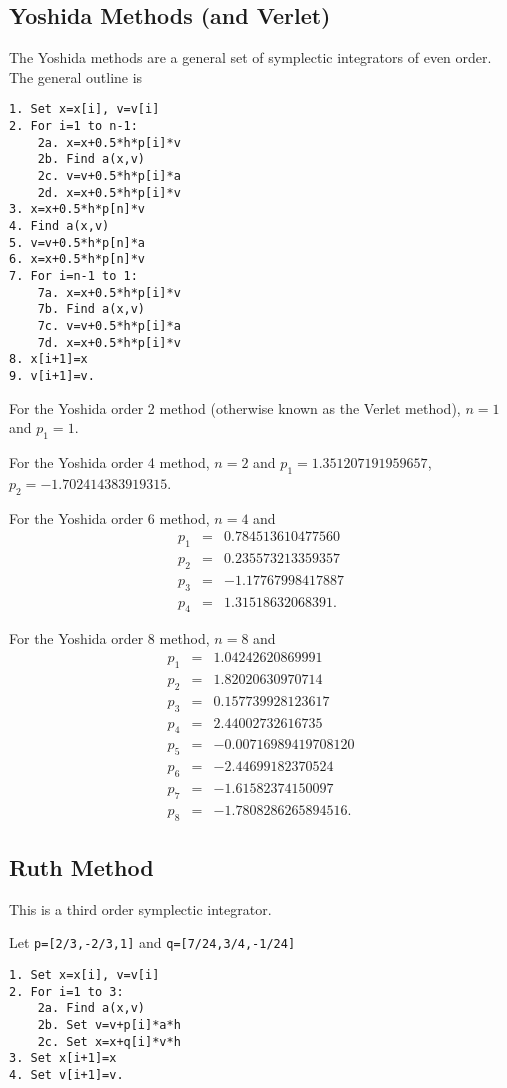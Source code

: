 \documentclass[11pt]{article}
\begin{document}
\subsection{Yoshida Methods (and Verlet)}
The Yoshida methods are a general set of symplectic integrators of even order.
The general outline is
\begin{verbatim}
1. Set x=x[i], v=v[i]
2. For i=1 to n-1:
    2a. x=x+0.5*h*p[i]*v
    2b. Find a(x,v)
    2c. v=v+0.5*h*p[i]*a
    2d. x=x+0.5*h*p[i]*v
3. x=x+0.5*h*p[n]*v
4. Find a(x,v)
5. v=v+0.5*h*p[n]*a
6. x=x+0.5*h*p[n]*v
7. For i=n-1 to 1:
    7a. x=x+0.5*h*p[i]*v
    7b. Find a(x,v)
    7c. v=v+0.5*h*p[i]*a
    7d. x=x+0.5*h*p[i]*v
8. x[i+1]=x
9. v[i+1]=v.
\end{verbatim}
For the Yoshida order 2 method 
(otherwise known as the Verlet method), $n=1$ and
$p_1=1$.

For the Yoshida order 4 method, $n=2$ and
$p_1=1.351207191959657$, $p_2=-1.702414383919315$.

For the Yoshida order 6 method, $n=4$ and\\
\begin{eqnarray*}
p_1&=&0.784513610477560\\
p_2&=&0.235573213359357\\
p_3&=&-1.17767998417887\\
p_4&=&1.31518632068391.
\end{eqnarray*}

For the Yoshida order 8 method, $n=8$ and\\
\begin{eqnarray*}
p_1&=&1.04242620869991\\
p_2&=&1.82020630970714\\
p_3&=&0.157739928123617\\
p_4&=&2.44002732616735\\
p_5&=&-0.00716989419708120\\
p_6&=&-2.44699182370524\\
p_7&=&-1.61582374150097\\
p_8&=& -1.7808286265894516.
\end{eqnarray*}

\subsection{Ruth Method}
This is a third order symplectic integrator.


Let \verb|p=[2/3,-2/3,1]| and \verb|q=[7/24,3/4,-1/24]|
\begin{verbatim}
1. Set x=x[i], v=v[i]
2. For i=1 to 3:
    2a. Find a(x,v)
    2b. Set v=v+p[i]*a*h
    2c. Set x=x+q[i]*v*h
3. Set x[i+1]=x
4. Set v[i+1]=v.
\end{verbatim}
\end{document}
